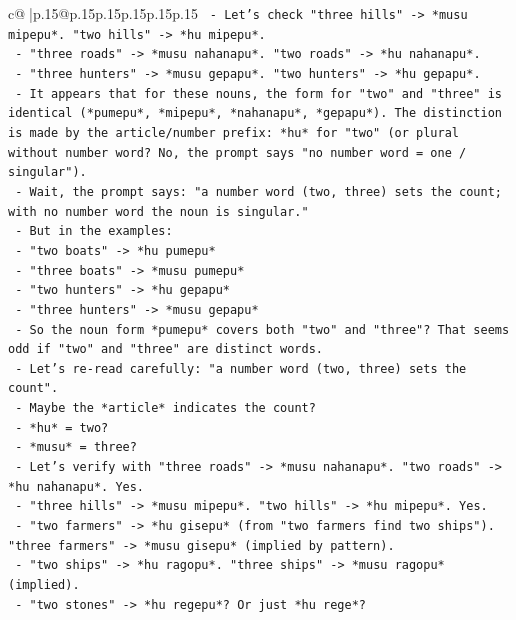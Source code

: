 \documentclass{article}
\begin{document}
{\begin{supertabular}{c@{$\;$}|p{.15\linewidth}@{}p{.15\linewidth}p{.15\linewidth}p{.15\linewidth}p{.15\linewidth}p{.15\linewidth}}
{{{\texttt{        {-} Let's check "three hills" {-}> *musu mipepu*. "two hills" {-}> *hu mipepu*.} \\
\texttt{        {-} "three roads" {-}> *musu nahanapu*. "two roads" {-}> *hu nahanapu*.} \\
\texttt{        {-} "three hunters" {-}> *musu gepapu*. "two hunters" {-}> *hu gepapu*.} \\
\texttt{        {-} It appears that for these nouns, the form for "two" and "three" is identical (*pumepu*, *mipepu*, *nahanapu*, *gepapu*). The distinction is made by the article/number prefix: *hu* for "two" (or plural without number word? No, the prompt says "no number word = one / singular").} \\
\texttt{        {-} Wait, the prompt says: "a number word (two, three) sets the count; with no number word the noun is singular."} \\
\texttt{        {-} But in the examples:} \\
\texttt{          {-} "two boats" {-}> *hu pumepu*} \\
\texttt{          {-} "three boats" {-}> *musu pumepu*} \\
\texttt{          {-} "two hunters" {-}> *hu gepapu*} \\
\texttt{          {-} "three hunters" {-}> *musu gepapu*} \\
\texttt{        {-} So the noun form *pumepu* covers both "two" and "three"? That seems odd if "two" and "three" are distinct words.} \\
\texttt{        {-} Let's re{-}read carefully: "a number word (two, three) sets the count".} \\
\texttt{        {-} Maybe the *article* indicates the count?} \\
\texttt{          {-} *hu* = two?} \\
\texttt{          {-} *musu* = three?} \\
\texttt{        {-} Let's verify with "three roads" {-}> *musu nahanapu*. "two roads" {-}> *hu nahanapu*. Yes.} \\
\texttt{        {-} "three hills" {-}> *musu mipepu*. "two hills" {-}> *hu mipepu*. Yes.} \\
\texttt{        {-} "two farmers" {-}> *hu gisepu* (from "two farmers find two ships"). "three farmers" {-}> *musu gisepu* (implied by pattern).} \\
\texttt{        {-} "two ships" {-}> *hu ragopu*. "three ships" {-}> *musu ragopu* (implied).} \\
\texttt{        {-} "two stones" {-}> *hu regepu*? Or just *hu rege*?} \\
}}}
\end{supertabular}}
\end{document}
